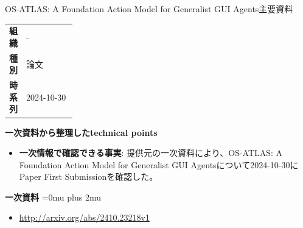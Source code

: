 \begin{technicalnote}{OS-ATLAS: A Foundation Action Model for Generalist GUI Agents}{主要資料}
\begingroup
\begin{tabularx}{\linewidth}{@{}>{\bfseries}p{0.22\linewidth}X@{}}
組織 & - \\
種別 & 論文 \\
時系列 & 2024-10-30 \\
\end{tabularx}
\smallskip
{\bfseries 一次資料から整理したtechnical points}
\begin{itemize}[leftmargin=1.5em,itemsep=0.35em]
\item \textbf{一次情報で確認できる事実}: 提供元の一次資料により、OS-ATLAS: A Foundation Action Model for Generalist GUI Agentsについて2024-10-30にPaper First Submissionを確認した。
\end{itemize}
\begin{minipage}{\linewidth}
\begin{samepage}
{\bfseries 一次資料}
\begingroup\sloppy
\Urlmuskip=0mu plus 2mu\relax
\begin{itemize}[leftmargin=1.5em,itemsep=0.25em]
\item {\scriptsize\url{http://arxiv.org/abs/2410.23218v1}}
\end{itemize}
\endgroup
\end{samepage}
\end{minipage}
\endgroup
\end{technicalnote}
\medskip


